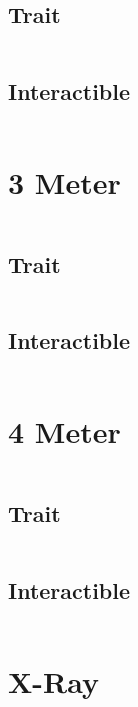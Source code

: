 \documentclass[main.tex]{subfiles}
\begin{document}
\subsection{Trait}

\begin{lstlisting}[language=FG]
\end{lstlisting}


\subsection{Interactible}
\begin{lstlisting}[language=FG]

\end{lstlisting}

\section{3 Meter}


\begin{lstlisting}[language=FG]
\end{lstlisting}

\subsection{Trait}

\begin{lstlisting}[language=FG]
\end{lstlisting}


\subsection{Interactible}
\begin{lstlisting}[language=FG]

\end{lstlisting}
\section{4 Meter}

\begin{lstlisting}[language=FG]
\end{lstlisting}

\subsection{Trait}

\begin{lstlisting}[language=FG]
\end{lstlisting}


\subsection{Interactible}
\begin{lstlisting}[language=FG]

\end{lstlisting}

\section{X-Ray}
\end{document}

